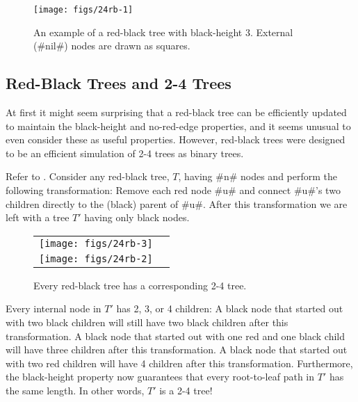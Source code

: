 \begin{figure}
  \begin{center}
    \texttt{[image: figs/24rb-1]}
  \end{center}
  \caption[A red-black tree]{An example of a red-black tree with black-height 3.  External (#nil#) nodes are drawn as squares.} 
\end{figure}


\subsection{Red-Black Trees and 2-4 Trees}

At first it might seem surprising that a red-black tree can be efficiently
updated to maintain the black-height and no-red-edge properties, and
it seems unusual to even consider these as useful properties.  However,
red-black trees were designed to be an efficient simulation of 2-4 trees
as binary trees.

Refer to .
Consider any red-black tree, $T$, having #n# nodes and perform the
following transformation: Remove each red node #u# and connect #u#'s two
children directly to the (black) parent of #u#.  After this transformation
we are left with a tree $T'$ having only black nodes.
\begin{figure}
  \begin{center}
    \begin{tabular}{cc}
      \texttt{[image: figs/24rb-3]} \\
      \texttt{[image: figs/24rb-2]}
    \end{tabular}
  \end{center}
  \caption{Every red-black tree has a corresponding 2-4 tree.}
\end{figure}

Every internal node in $T'$ has 2, 3, or 4 children: A black node that
started out with two black children will still have two black children
after this transformation.  A black node that started out with one red
and one black child will have three children after this transformation.
A black node that started out with two red children will have 4 children
after this transformation.  Furthermore, the black-height property now
guarantees that every root-to-leaf path in $T'$ has the same length.
In other words, $T'$ is a 2-4 tree!

